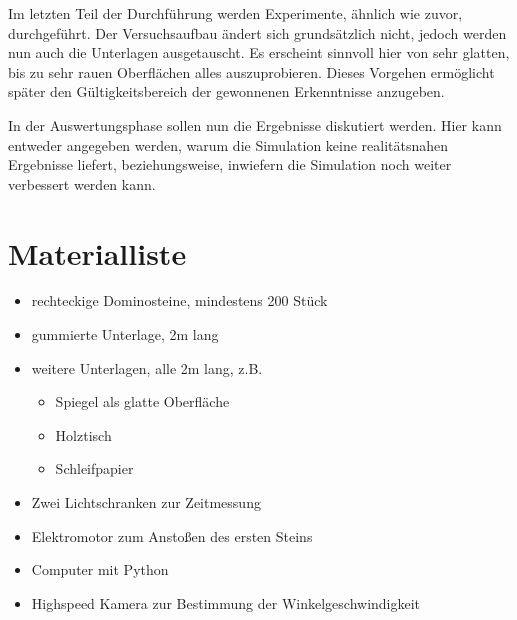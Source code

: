 \documentclass[11pt,a4paper]{scrartcl}
\begin{document}
Im letzten Teil der Durchführung werden Experimente, ähnlich wie zuvor,
durchgeführt. Der Versuchsaufbau ändert sich grundsätzlich nicht, jedoch
werden nun auch die Unterlagen ausgetauscht. Es erscheint sinnvoll hier von
sehr glatten, bis zu sehr rauen Oberflächen alles auszuprobieren. Dieses
Vorgehen ermöglicht später den Gültigkeitsbereich der gewonnenen Erkenntnisse
anzugeben.

In der Auswertungsphase sollen nun die Ergebnisse diskutiert werden. Hier kann
entweder angegeben werden, warum die Simulation keine realitätsnahen Ergebnisse
liefert, beziehungsweise, inwiefern die Simulation noch weiter verbessert
werden kann.


\section{Materialliste}
\begin{itemize}
    \item rechteckige Dominosteine, mindestens 200 Stück
    \item gummierte Unterlage, 2m lang
    \item weitere Unterlagen, alle 2m lang, z.B.
    \begin{itemize}
        \item Spiegel als glatte Oberfläche
        \item Holztisch
        \item Schleifpapier
    \end{itemize}
    \item Zwei Lichtschranken zur Zeitmessung
    \item Elektromotor zum Anstoßen des ersten Steins
    \item Computer mit Python
    \item Highspeed Kamera zur Bestimmung der Winkelgeschwindigkeit \\
\end{itemize}
\end{document}
